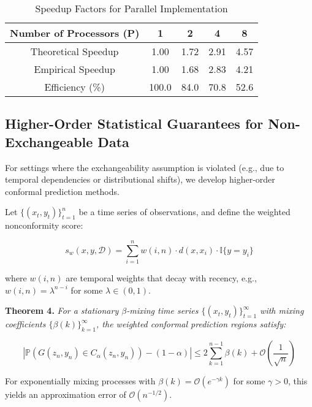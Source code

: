\documentclass{article}
\theoremstyle{plain}
\theoremstyle{definition}
\theoremstyle{remark}
\begin{document}
\begin{table}[htbp]
\centering
\caption{Speedup Factors for Parallel Implementation}
\label{tab:parallel_speedup}
\begin{tabular}{|c|c|c|c|c|}
\hline
\textbf{Number of Processors (P)} & \textbf{1} & \textbf{2} & \textbf{4} & \textbf{8} \\
\hline
Theoretical Speedup & 1.00 & 1.72 & 2.91 & 4.57 \\
\hline
Empirical Speedup & 1.00 & 1.68 & 2.83 & 4.21 \\
\hline
Efficiency (\%) & 100.0 & 84.0 & 70.8 & 52.6 \\
\hline
\end{tabular}
\end{table}

\subsection{Higher-Order Statistical Guarantees for Non-Exchangeable Data}

For settings where the exchangeability assumption is violated (e.g., due to temporal dependencies or distributional shifts), we develop higher-order conformal prediction methods.

Let $\{(x_t, y_t)\}_{t=1}^n$ be a time series of observations, and define the weighted nonconformity score:

\begin{equation}
s_w(x, y, \mathcal{D}) = \sum_{i=1}^n w(i, n) \cdot d(x, x_i) \cdot \mathbb{I}\{y = y_i\}
\end{equation}

where $w(i, n)$ are temporal weights that decay with recency, e.g., $w(i, n) = \lambda^{n-i}$ for some $\lambda \in (0, 1)$.

\textbf{Theorem 4.} \textit{For a stationary $\beta$-mixing time series $\{(x_t, y_t)\}_{t=1}^{\infty}$ with mixing coefficients $\{\beta(k)\}_{k=1}^{\infty}$, the weighted conformal prediction regions satisfy:}

\begin{equation}
\left| \mathbb{P}(G(z_n, y_n) \in C_{\alpha}(z_n, y_n)) - (1 - \alpha) \right| \leq 2\sum_{k=1}^{n-1} \beta(k) + \mathcal{O}\left(\frac{1}{\sqrt{n}}\right)
\end{equation}

For exponentially mixing processes with $\beta(k) = \mathcal{O}(e^{-\gamma k})$ for some $\gamma > 0$, this yields an approximation error of $\mathcal{O}(n^{-1/2})$.
\end{document}
